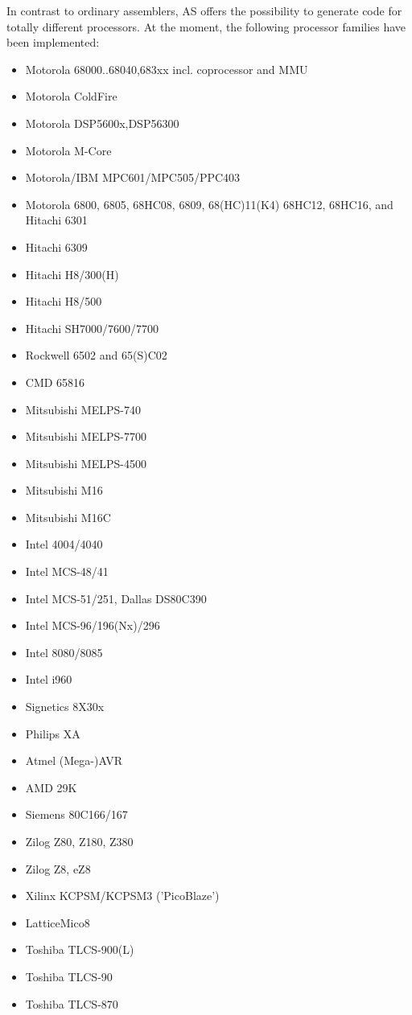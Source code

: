 \documentclass[12pt,twoside]{report}
\begin{document}
In contrast to ordinary assemblers, AS offers the possibility to 
generate code for totally different processors.  At the moment, the 
following processor families have been implemented:
\begin{itemize}
\item{Motorola 68000..68040,683xx incl. coprocessor and MMU}
\item{Motorola ColdFire}
\item{Motorola DSP5600x,DSP56300}
\item{Motorola M-Core}
\item{Motorola/IBM MPC601/MPC505/PPC403}
\item{Motorola 6800, 6805, 68HC08, 6809, 68(HC)11(K4) 68HC12, 68HC16, and Hitachi
      6301}
\item{Hitachi 6309}
\item{Hitachi H8/300(H)}
\item{Hitachi H8/500}
\item{Hitachi SH7000/7600/7700}
\item{Rockwell 6502 and 65(S)C02}
\item{CMD 65816}
\item{Mitsubishi MELPS-740}
\item{Mitsubishi MELPS-7700}
\item{Mitsubishi MELPS-4500}
\item{Mitsubishi M16}
\item{Mitsubishi M16C}
\item{Intel 4004/4040}
\item{Intel MCS-48/41}
\item{Intel MCS-51/251, Dallas DS80C390}
\item{Intel MCS-96/196(Nx)/296}
\item{Intel 8080/8085}
\item{Intel i960}
\item{Signetics 8X30x}
\item{Philips XA}
\item{Atmel (Mega-)AVR}
\item{AMD 29K}
\item{Siemens 80C166/167}
\item{Zilog Z80, Z180, Z380}
\item{Zilog Z8, eZ8}
\item{Xilinx KCPSM/KCPSM3 ('PicoBlaze')}
\item{LatticeMico8}
\item{Toshiba TLCS-900(L)}
\item{Toshiba TLCS-90}
\item{Toshiba TLCS-870}

\end{itemize}
\end{document}
